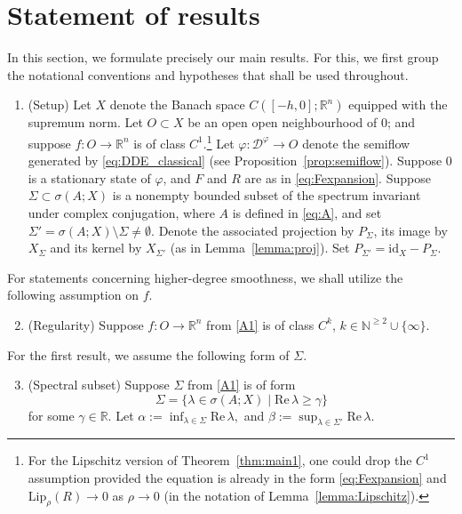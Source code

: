\documentclass[a4paper, 12pt, oneside, reqno, notitlepage]{amsart}
\theoremstyle{plain}
\theoremstyle{definition}
\theoremstyle{remark}
\newcommand{\lip}{\mathrm{Lip}}
\begin{document}
\section{Statement of results}
\label{sect:statement}

In this section, we formulate precisely our main results.
For this, we first group the notational conventions and hypotheses that shall be used throughout.

\begin{enumerate}[label =(A.\arabic*)] 
    \item \label{A1} (Setup) Let $X$ denote the Banach space $ C([-h,0];\mathbb{R}^n)$ equipped with the supremum norm. Let $O \subset X$ be an open open neighbourhood of $0$; and suppose $f : O \to \mathbb{R}^n$ is of class $C^1$.\footnote{For the Lipschitz version of Theorem~\ref{thm:main1}, one could drop the $C^1$ assumption provided the equation is already in the form \eqref{eq:Fexpansion} and $\lip_\rho(R) \to 0$ as $\rho \to 0$ (in the notation of Lemma~\ref{lemma:Lipschitz}).}
    Let $\varphi: \mathcal{D}^\varphi \to O$ denote the semiflow generated by \eqref{eq:DDE_classical} (see Proposition~\ref{prop:semiflow}).
    Suppose $0$ is a stationary state of $\varphi$, and $F$ and $R$ are as in \eqref{eq:Fexpansion}.
    Suppose $\Sigma \subset \sigma(A;X)$ is a nonempty bounded subset of the spectrum invariant under complex conjugation, where $A$ is defined in \eqref{eq:A}, and set $\Sigma' = \sigma(A;X) \setminus \Sigma \neq \emptyset$. Denote the associated projection by $P_\Sigma$, its image by $X_\Sigma$ and its kernel by $X_{\Sigma'}$ (as in Lemma~\ref{lemma:proj}). Set $P_{\Sigma'} = \mathrm{id}_X - P_\Sigma$. 
\end{enumerate}
For statements concerning higher-degree smoothness, we shall utilize the following assumption on $f$.
\begin{enumerate}[label =(A.\arabic*)]
    \setcounter{enumi}{1}
    \item \label{A2} (Regularity) Suppose $f : O \to \mathbb{R}^n$ from \ref{A1} is of class $C^k$, $k \in \mathbb{N}^{\geq 2} \cup \{ \infty \}$.
\end{enumerate}
For the first result, we assume the following form of $\Sigma$.
\begin{enumerate}[label =(A.\arabic*)]
    \setcounter{enumi}{2}
    \item \label{A3} (Spectral subset) Suppose $\Sigma$ from \ref{A1} is of form
    \begin{displaymath}
        \Sigma = \{ \lambda \in \sigma(A;X) \; | \; \mathrm{Re} \, \lambda \geq \gamma \}
    \end{displaymath}
    for some $\gamma \in \mathbb{R}$. Let $\alpha :=\inf_{\lambda \in \Sigma} \mathrm{Re} \, \lambda,$ and $\beta := \sup_{\lambda \in {\Sigma'}} \mathrm{Re} \, \lambda$.
\end{enumerate}
\end{document}
